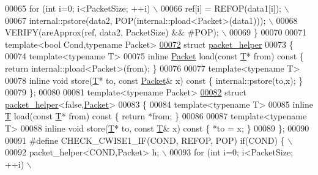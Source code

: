\begin{DoxyCode}
00065 \textcolor{preprocessor}{  for (int i=0; i<PacketSize; ++i) \(\backslash\)}
00066 \textcolor{preprocessor}{    ref[i] = REFOP(data1[i]); \(\backslash\)}
00067 \textcolor{preprocessor}{  internal::pstore(data2, POP(internal::pload<Packet>(data1))); \(\backslash\)}
00068 \textcolor{preprocessor}{  VERIFY(areApprox(ref, data2, PacketSize) && #POP); \(\backslash\)}
00069 \textcolor{preprocessor}{\}}
00070 
00071 \textcolor{keyword}{template}<\textcolor{keywordtype}{bool} Cond,\textcolor{keyword}{typename} Packet>
\hyperlink{structpacket__helper}{00072} \textcolor{keyword}{struct }\hyperlink{structpacket__helper}{packet\_helper}
00073 \{
00074   \textcolor{keyword}{template}<\textcolor{keyword}{typename} T>
00075   \textcolor{keyword}{inline} \hyperlink{group___sparse_core___module}{Packet} load(\textcolor{keyword}{const} \hyperlink{group___sparse_core___module}{T}* from)\textcolor{keyword}{ const }\{ \textcolor{keywordflow}{return} internal::pload<Packet>(from); \}
00076 
00077   \textcolor{keyword}{template}<\textcolor{keyword}{typename} T>
00078   \textcolor{keyword}{inline} \textcolor{keywordtype}{void} store(\hyperlink{group___sparse_core___module}{T}* to, \textcolor{keyword}{const} \hyperlink{group___sparse_core___module}{Packet}& x)\textcolor{keyword}{ const }\{ internal::pstore(to,x); \}
00079 \};
00080 
00081 \textcolor{keyword}{template}<\textcolor{keyword}{typename} Packet>
\hyperlink{structpacket__helper_3_01false_00_01_packet_01_4}{00082} \textcolor{keyword}{struct }\hyperlink{structpacket__helper}{packet\_helper}<false,\hyperlink{group___sparse_core___module}{Packet}>
00083 \{
00084   \textcolor{keyword}{template}<\textcolor{keyword}{typename} T>
00085   \textcolor{keyword}{inline} \hyperlink{group___sparse_core___module}{T} load(\textcolor{keyword}{const} \hyperlink{group___sparse_core___module}{T}* from)\textcolor{keyword}{ const }\{ \textcolor{keywordflow}{return} *from; \}
00086 
00087   \textcolor{keyword}{template}<\textcolor{keyword}{typename} T>
00088   \textcolor{keyword}{inline} \textcolor{keywordtype}{void} store(\hyperlink{group___sparse_core___module}{T}* to, \textcolor{keyword}{const} \hyperlink{group___sparse_core___module}{T}& x)\textcolor{keyword}{ const }\{ *to = x; \}
00089 \};
00090 
00091 \textcolor{preprocessor}{#define CHECK\_CWISE1\_IF(COND, REFOP, POP) if(COND) \{ \(\backslash\)}
00092 \textcolor{preprocessor}{  packet\_helper<COND,Packet> h; \(\backslash\)}
00093 \textcolor{preprocessor}{  for (int i=0; i<PacketSize; ++i) \(\backslash\)}

\end{DoxyCode}
